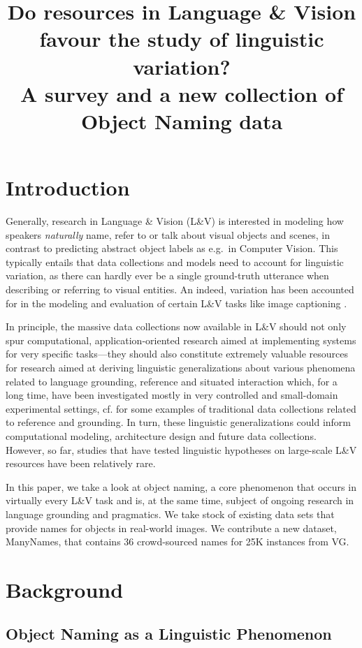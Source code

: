 \documentclass[10pt, a4paper]{article}
\title{Do resources in Language \& Vision favour the study of linguistic variation? \\ \vspace*{.5\baselineskip} A survey and a new collection of Object Naming data}
\newcommand{\vg}{VG\xspace}
\begin{document}
\maketitleabstract

\section{Introduction}

Generally, research in Language \& Vision (L\&V) is interested in modeling how speakers \textit{naturally} name, refer to or talk about visual objects and scenes, in contrast to predicting abstract object labels as e.g.\ in Computer Vision.
This typically entails that data collections and models need to account for linguistic variation, as there can hardly ever be a single ground-truth utterance when describing or referring to visual entities. 
An indeed, variation has been accounted for in the modeling and evaluation of certain L\&V tasks like image captioning \cite{vedantam2015cider,Bernardietal:automatic,dai2017towards}.

In principle, the massive data collections now available in L\&V should not only spur computational, application-oriented research aimed at implementing systems for very specific tasks---they should also constitute extremely valuable resources for research aimed at deriving linguistic generalizations about various phenomena related to language grounding, reference and situated interaction which, for a long time, have been investigated mostly in very controlled and small-domain experimental settings, cf. \cite{anderson1991hcrc,fernangen:sigd07,krahmer:2012,takenobu2012rex,zarriess2016pentoref} for some examples of traditional data collections related to reference and grounding.  
In turn, these linguistic generalizations could inform computational modeling, architecture design and future data collections.
However, so far, studies that have tested linguistic hypotheses on large-scale L\&V resources have been relatively rare. 

In this paper, we take a look at object naming, a core phenomenon that occurs in virtually every L\&V task and is, at the same time, subject of ongoing research in language grounding and pragmatics. 
We take stock of existing data sets that provide names for objects in real-world images. We contribute a new dataset, ManyNames, that contains 36 crowd-sourced names for 25K instances from \vg.

\section{Background}

\subsection{Object Naming as a Linguistic Phenomenon}
\end{document}
